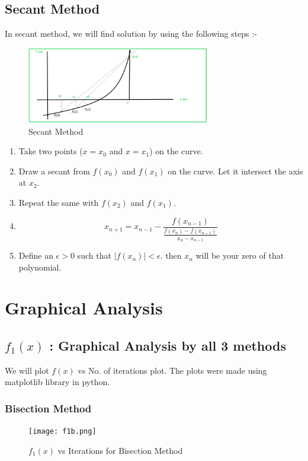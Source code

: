 \documentclass[12pt]{article}
\begin{document}
\subsection{Secant Method}
In secant method, we will find solution by using the following steps :-
\begin{figure}[H]
    \centering
    \includegraphics[width=8cm]{sec.png}
    \caption{Secant Method}
\end{figure}
\begin{enumerate}
    \item Take two points ($x=x_0$ and $x=x_1$) on the curve.
    \item Draw a secant from $f(x_0)$ and $f(x_1)$ on the curve. Let it intersect the axis at $x_2$.
    \item Repeat the same with  $f(x_2)$ and $f(x_1)$.
    \item \begin{equation*}
        x_{n+1}=x_{n-1} - \frac{f(x_{n-1})}{\frac{f(x_n)-f(x_{n-1})}{x_n - x_{n-1}}}
    \end{equation*}
    \item Define an $\epsilon >0$ such that $|f(x_n)|<\epsilon$. then $x_n$ will be your zero of that polynomial.
\end{enumerate}

\section{Graphical Analysis}
\subsection{$f_1(x)$ : Graphical Analysis by all 3 methods}
We will plot $f(x)$ vs No. of iterations plot. The plots were made using matplotlib library in python.
\subsubsection{Bisection Method}
\begin{figure}[H]
    \centering
    \texttt{[image: f1b.png]}
    \caption{$f_1(x)$ vs Iterations for Bisection Method}
\end{figure}
\end{document}
